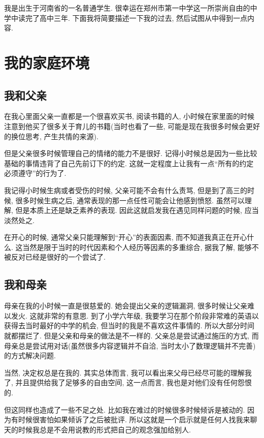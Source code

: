 

    我是出生于河南省的一名普通学生. 很幸运在郑州市第一中学这一所崇尚自由的中学中读完了高中三年. 下面我将简要描述一下我的过去, 然后试图从中得到一点内容. 

    \section{我的家庭环境}
    \subsection{我和父亲}

    在我心里面父亲一直都是一个很喜欢买书, 阅读书籍的人, 小时候在家里面的时候注意到他买了很多关于育儿的书籍(当时也看了一些, 可能是现在我很多时候会更好的换位思考, 产生共情的来源).  

    但是父亲很多时候管理自己的情绪的能力不是很好. 记得小时候总是因为一些比较基础的事情违背了自己先前订下的约定. 这就一定程度上让我有一点``所有的约定必须遵守''的行为了. 

    我记得小时候生病或者受伤的时候, 父亲可能不会有什么责骂, 但是到了高三的时候, 很多时候生病之后, 通常表现的那一点任性可能会让他感到愤怒. 虽然可以理解, 但是本质上还是缺乏素养的表现. 因此这就启发我在遇见同样问题的时候, 应当淡然处之. 

    在开心的时候, 通常父亲只能理解到``开心''的表面因素, 而不知道我真正在开心什么. 这当然是限于当时的时代因素和个人经历等因素的多重综合, 据我了解, 能够不被反对已经是很好的一个尝试了.

    

    \subsection{我和母亲}

    母亲在我的小时候一直是很慈爱的. 她会提出父亲的逻辑漏洞, 很多时候让父亲难以发火. 这就非常的有意思. 到了小学六年级, 我要学习在那个阶段非常难的英语以获得去当时最好的中学的机会, 但当时的我是不喜欢这件事情的. 所以大部分时间就都摆烂了. 但是父亲和母亲的做法是不一样的. 父亲总是尝试通过施压的方式, 而母亲总是尝试用对话(虽然很多内容逻辑并不自洽, 当时太小了数理逻辑并不完善)的方式解决问题.
    
    当然, 决定权总是在我的. 其实总体而言, 我可以看出来父母已经尽可能的理解我了, 并且提供给我了足够多的自由空间, 这一点而言, 我也是对他们没有任何怨恨的. 

    但这同样也造成了一些不足之处. 比如我在难过的时候很多时候倾诉是被动的. 因为有时候很害怕如果倾诉了之后被批评. 所以这就是一个启示就是任何人找我来聊天的时候我总是不会用说教的形式把自己的观念强加给别人. 

